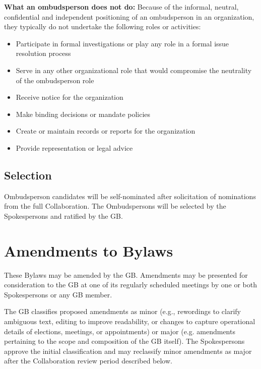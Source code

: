 \documentclass[12pt]{article}
\begin{document}
{\bf What an ombudsperson does not do:} Because of the informal, neutral, confidential and independent positioning of an ombudsperson
in an organization, they typically do not undertake the following roles or activities:
\begin{itemize}

\item Participate in formal investigations or play any role in a formal issue resolution process

\item Serve in any other organizational role that would compromise the neutrality of the ombudsperson role

\item Receive notice for the organization

\item Make binding decisions or mandate policies

\item Create or maintain records or reports for the organization

\item Provide representation or legal advice

\end{itemize}

\subsection{Selection}
Ombudsperson candidates will be self-nominated after solicitation of nominations from the full Collaboration. The Ombudspersons will be selected by the Spokespersons and ratified by the GB.

\section{Amendments to Bylaws}
\label{sec:amend}
These Bylaws may be amended by the GB. Amendments may be presented for consideration to the GB at one of its regularly scheduled meetings by one or both Spokespersons or any GB member.

The GB  classifies proposed amendments as minor (e.g., rewordings to clarify ambiguous text, editing to improve readability, or changes to capture operational details of elections, meetings, or appointments) or major (e.g. amendments pertaining to the scope and composition of the GB itself).  The Spokespersons approve the initial classification and may reclassify minor amendments as major after the Collaboration review period described below.
\end{document}
